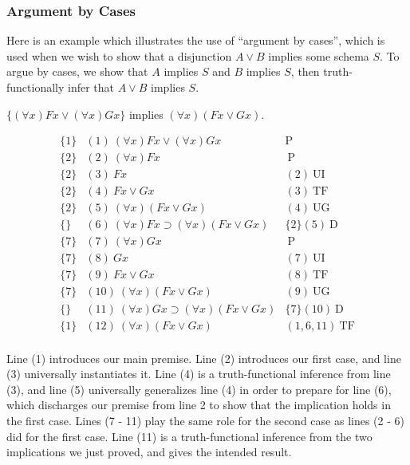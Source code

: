 \subsubsection*{Argument by Cases}
Here is an example which illustrates the use of ``argument by cases'', which is used when we wish to show that a disjunction $A \vee B$ implies some schema $S$. To argue by cases, we show that $A$ implies $S$ and $B$ implies $S$, then truth-functionally infer that $A \vee B$ implies $S$. 

\begin{center}
$\{(\forall x)Fx\vee(\forall x)Gx\}$ implies $(\forall x)(Fx\vee Gx).$
\end{center}
\[
\begin{array}{lll}
\{1\}   & (1)\  (\forall x)Fx\vee(\forall x)Gx &  \mathrm{P}\\
\{2\}   & (2)\ (\forall x)Fx &  \ \mathrm{P}\\
\{2\}   & (3)\ Fx &  (2)\ \mathrm{UI}\\
\{2\}   & (4)\ Fx\vee Gx   & (3)\ \mathrm{TF}\\
\{2\}   & (5)\ (\forall x) (Fx\vee Gx)  & (4)\ \mathrm{UG}\\
\{\}   & (6)\ (\forall x)Fx\supset(\forall x) (Fx\vee Gx)   & \{2\}(5)\ \mathrm{D}\\
\{7\}   & (7)\ (\forall x)Gx &  \ \mathrm{P}\\
\{7\}   & (8)\ Gx &  (7)\ \mathrm{UI}\\
\{7\}   & (9)\ Fx\vee Gx   & (8)\ \mathrm{TF}\\
\{7\}   & (10)\ (\forall x) (Fx\vee Gx)  & (9)\ \mathrm{UG}\\
\{\}   & (11)\ (\forall x)Gx\supset(\forall x) (Fx\vee Gx)   & \{7\}(10)\ \mathrm{D}\\
\{1\}   & (12)\ (\forall x) (Fx\vee Gx)  & (1,6,11)\ \mathrm{TF}\\
\end{array}
\]

\begin{aside}
    Line (1) introduces our main premise. Line (2) introduces our first case, and line (3) universally instantiates it. Line (4) is a truth-functional inference from line (3), and line (5) universally generalizes line (4) in order to prepare for line (6), which discharges our premise from line 2 to show that the implication holds in the first case. Lines (7 - 11) play the same role for the second case as lines (2 - 6) did for the first case. Line (11) is a truth-functional inference from the two implications we just proved, and gives the intended result. 
\end{aside}


